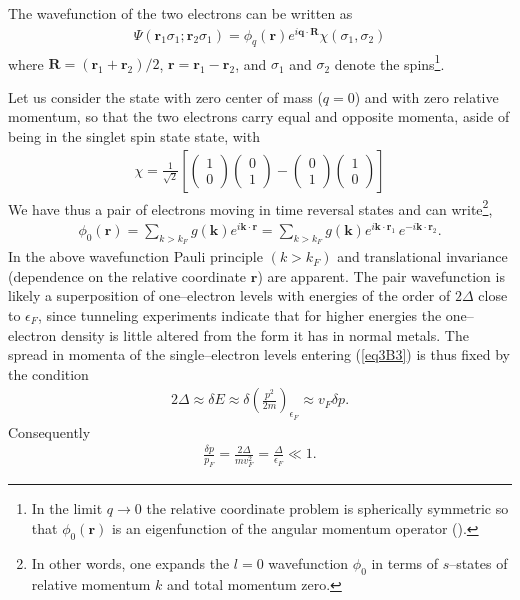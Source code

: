 \begin{subappendices}
The wavefunction of the two electrons can be written as
\begin{align}\label{eq3B1}
\Psi(\mathbf r_1\sigma_1;\mathbf r_2\sigma_1)=\phi_q(\mathbf r)e^{i\mathbf q\cdot\mathbf R}\chi(\sigma_1,\sigma_2)
\end{align}
where $\mathbf R=(\mathbf r_1+\mathbf r_2)/2$, $\mathbf r=\mathbf r_1-\mathbf r_2$, and $\sigma_1$ and $\sigma_2$ denote the spins\footnote{In the limit $q\rightarrow 0$ the relative coordinate problem is spherically symmetric so that $\phi_0(\mathbf r)$ is an eigenfunction of the angular momentum operator (\cite{Schrieffer:64}).}. 


Let us consider the state with zero center of mass ($q=0$) and with zero relative  momentum, so that the two electrons carry  equal and opposite momenta, aside of being in the singlet spin state state, with
\begin{align}\label{eq3B2}
\chi=\frac{1}{\sqrt{2}}\left[
\left(\begin{array}{c}
1\\ 
0
\end{array} \right)
\left(\begin{array}{c}
0\\ 
1
\end{array} \right)-
\left(\begin{array}{c}
0\\ 
1
\end{array} \right)
\left(\begin{array}{c}
1\\ 
0
\end{array} \right)
\right]
\end{align}
 We have thus a pair of electrons moving in time reversal states and can write\footnote{In other words, one expands the $l=0$ wavefunction $\phi_0$ in terms of $s$--states of relative momentum $k$ and total momentum zero.},
\begin{align}\label{eq3B3}
\phi_0(\mathbf r)=\sum_{k>k_F}g(\mathbf k)e^{i\mathbf k\cdot\mathbf r}=\sum_{k>k_F}g(\mathbf k)e^{i\mathbf k\cdot\mathbf r_1}\,e^{-i\mathbf k\cdot\mathbf r_2}.
\end{align}
In the above wavefunction Pauli principle $(k>k_F)$ and translational invariance (dependence on the relative coordinate $\mathbf r$) are apparent. The pair wavefunction is likely a superposition of one--electron levels with energies of the order of $2\Delta$ close to $\epsilon_F$, since tunneling experiments indicate that for higher energies the one--electron density is little altered from the form it has in normal metals. The spread in momenta of the single--electron levels entering (\ref{eq3B3}) is thus fixed by the condition 
\begin{align}\label{eq3B4}
2\Delta\approx\delta E\approx\delta \left(\frac{p^2}{2m}\right)_{\epsilon_F}\approx v_F\delta p.
\end{align}
Consequently
\begin{align}\label{eq3B5}
\frac{\delta p}{p_F}=\frac{2\Delta}{mv_F^2}=\frac{\Delta}{\epsilon_F}\ll1.
\end{align}


\end{subappendices}
